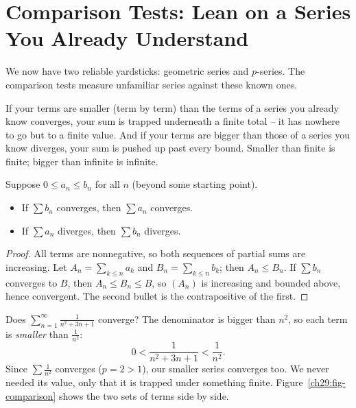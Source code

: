 \section{Comparison Tests: Lean on a Series You Already Understand}
\label{ch29:comparison}

We now have two reliable yardsticks: geometric series and $p$-series. The comparison tests measure unfamiliar series against these known ones.

\begin{intuitionbox}
If your terms are smaller (term by term) than the terms of a series you already know converges, your sum is trapped underneath a finite total -- it has nowhere to go but to a finite value. And if your terms are bigger than those of a series you know diverges, your sum is pushed up past every bound. Smaller than finite is finite; bigger than infinite is infinite.
\end{intuitionbox}

\begin{theorem}
\label{ch29:thm-comparison}
Suppose $0 \le a_n \le b_n$ for all $n$ (beyond some starting point).
\begin{itemize}
\item If $\sum b_n$ converges, then $\sum a_n$ converges.
\item If $\sum a_n$ diverges, then $\sum b_n$ diverges.
\end{itemize}
\end{theorem}

\begin{proof}
All terms are nonnegative, so both sequences of partial sums are increasing. Let $A_n=\sum_{k\le n} a_k$ and $B_n = \sum_{k\le n} b_k$; then $A_n \le B_n$. If $\sum b_n$ converges to $B$, then $A_n \le B_n \le B$, so $(A_n)$ is increasing and bounded above, hence convergent. The second bullet is the contrapositive of the first.
\end{proof}

\begin{example}
Does $\displaystyle\sum_{n=1}^\infty \frac{1}{n^2 + 3n + 1}$ converge? The denominator is bigger than $n^2$, so each term is \emph{smaller} than $\tfrac{1}{n^2}$:
\[
0 < \frac{1}{n^2+3n+1} < \frac{1}{n^2}.
\]
Since $\sum \tfrac1{n^2}$ converges ($p=2>1$), our smaller series converges too. We never needed its value, only that it is trapped under something finite. Figure~\ref{ch29:fig-comparison} shows the two sets of terms side by side.
\end{example}

